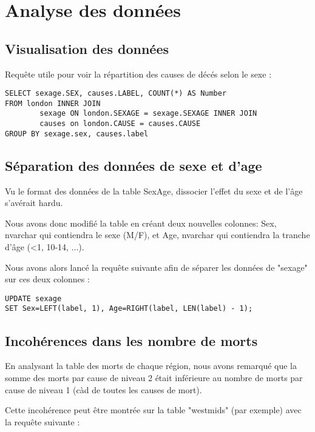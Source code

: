 \chapter{Analyse des données}

\section{Visualisation des données}

Requête utile pour voir la répartition des causes de décés selon le sexe :

\begin{lstlisting}[frame=single]
SELECT sexage.SEX, causes.LABEL, COUNT(*) AS Number
FROM london INNER JOIN
        sexage ON london.SEXAGE = sexage.SEXAGE INNER JOIN
        causes on london.CAUSE = causes.CAUSE
GROUP BY sexage.sex, causes.label
\end{lstlisting}

\section{Séparation des données de sexe et d'age}

    Vu le format des données de la table SexAge, dissocier l'effet du sexe et de l'âge s'avérait hardu.

    Nous avons donc modifié la table en créant deux nouvelles colonnes: Sex, nvarchar qui contiendra le sexe (M/F), et Age,
    nvarchar qui contiendra la tranche d'âge (<1, 10-14, ...).

    Nous avons alors lancé la requête suivante afin de séparer les données de "sexage" sur ces deux colonnes :

    \begin{lstlisting}[frame=single]
UPDATE sexage
SET Sex=LEFT(label, 1), Age=RIGHT(label, LEN(label) - 1);
    \end{lstlisting}

\section{Incohérences dans les nombre de morts}

    En analysant la table des morts de chaque région, nous avons remarqué que la somme des morts par cause de niveau 2 était
    inférieure au nombre de morts par cause de niveau 1 (càd de toutes les causes de mort).

    Cette incohérence peut être montrée sur la table "westmids" (par exemple) avec la requête suivante :

